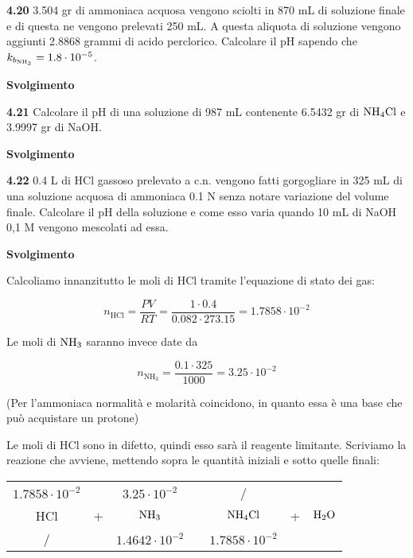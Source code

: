\vspace{0.2cm}

\vspace{0.2cm}\textbf{4.20} 3.504 gr di ammoniaca acquosa vengono sciolti in 870 mL di soluzione finale e di questa ne vengono prelevati 250 mL. A questa aliquota di soluzione vengono aggiunti 2.8868 grammi di acido perclorico. Calcolare il pH sapendo che $k_{b_{\rm NH_3}}=1.8 \cdot 10^{-5}$.

\vspace{0.2cm}\large\textbf{Svolgimento}\normalsize

\vspace{0.2cm}

\vspace{0.2cm}\textbf{4.21} Calcolare il pH di una soluzione di 987 mL contenente 6.5432 gr di $\rm NH_4Cl$ e 3.9997 gr di NaOH.

\large\textbf{Svolgimento}\normalsize

\vspace{0.2cm}

\vspace{0.2cm}\textbf{4.22} 0.4 L di HCl gassoso prelevato a c.n. vengono fatti gorgogliare in 325 mL di una soluzione acquosa di ammoniaca 0.1 N senza notare variazione del volume finale. Calcolare il pH della soluzione e come esso varia quando 10 mL di NaOH 0,1 M vengono mescolati ad essa.

\vspace{0.2cm}\large\textbf{Svolgimento}\normalsize

\vspace{0.2cm} Calcoliamo innanzitutto le moli di HCl tramite l'equazione di stato dei gas:

$$n_{\text{HCl}}=\frac{PV}{RT}=\frac{1 \cdot 0.4}{0.082 \cdot 273.15}=1.7858 \cdot 10^{-2}$$

Le moli di $\rm NH_3$ saranno invece date da

$$n_{\text{NH}_3}=\frac{0.1 \cdot 325}{1000}=3.25 \cdot 10^{-2}$$

(Per l'ammoniaca normalità e molarità coincidono, in quanto essa è una base che può acquistare un protone)

Le moli di HCl sono in difetto, quindi esso sarà il reagente limitante. Scriviamo la reazione che avviene, mettendo sopra le quantità iniziali e sotto quelle finali:

\begin{center}
    \begin{tabular}{ccccccc}
        $1.7858 \cdot 10^{-2}$ &  & $3.25 \cdot 10^{-2}$ & & / & &\\
        HCl & + & $\rm NH_3$ & \ce{->} & $\rm NH_4Cl$ & + & $\rm H_2O$\\
        / &  &  $1.4642 \cdot 10^{-2}$ & & $1.7858 \cdot 10^{-2}$ & &\\
    \end{tabular}
\end{center}

